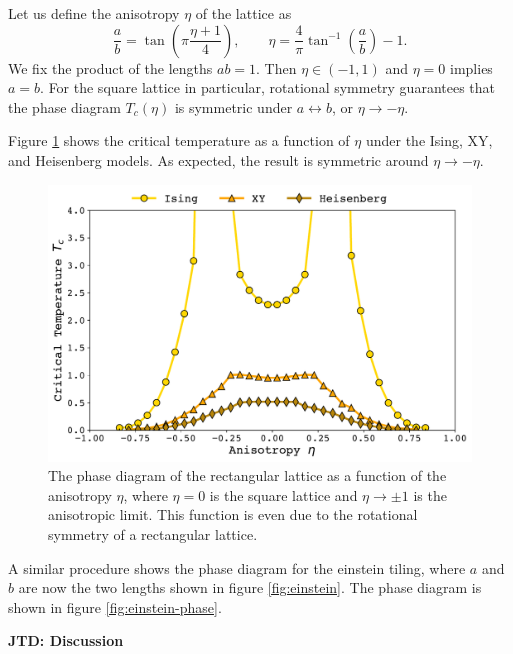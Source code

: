 \documentclass[amsmath,amssymb,aps,twocolumn,nofootinbib]{revtex4-2}
\newcommand{\parens}[1]{\left ( #1 \right )}
\newcommand{\jtd}[1]{{\color{red}\textbf{JTD: #1}}}
\begin{document}
Let us define the anisotropy $\eta$ of the lattice as 
\begin{equation}
  \frac{a}{b} = \tan\parens{\pi\frac{\eta + 1}4},\qquad \eta = \frac{4}{\pi}\tan^{-1}\parens{\frac{a}{b}}-1.
  \label{eqn:anisotropy}
\end{equation}
We fix the product of the lengths $ab=1$. Then $\eta \in (-1,1)$ and $\eta=0$ implies $a=b$. For the square lattice in particular, rotational symmetry guarantees that the phase diagram $T_c(\eta)$ is symmetric under $a\leftrightarrow b$, or $\eta \rightarrow -\eta$.

Figure \ref{fig:rect-phase} shows the critical temperature as a function of $\eta$ under the Ising, XY, and Heisenberg models. As expected, the result is symmetric around $\eta \rightarrow -\eta$.

\begin{figure}
  \centering
  \includegraphics[width=\linewidth]{../figs/rect-phase.pdf}
  \caption{The phase diagram of the rectangular lattice as a function of the anisotropy $\eta$, where $\eta = 0$ is the square lattice and $\eta\rightarrow \pm 1$ is the anisotropic limit. This function is even due to the rotational symmetry of a rectangular lattice.}
  \label{fig:rect-phase}
\end{figure}

A similar procedure shows the phase diagram for the einstein tiling, where $a$ and $b$ are now the two lengths shown in figure \ref{fig:einstein}. The phase diagram is shown in figure \ref{fig:einstein-phase}.

\jtd{Discussion}
\end{document}
